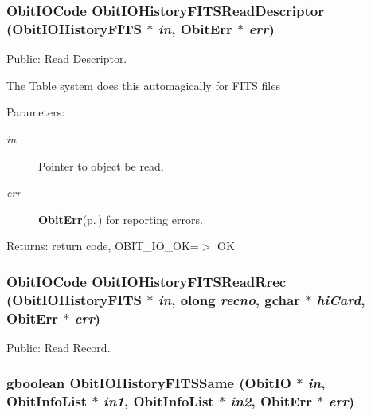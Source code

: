 \subsubsection{\setlength{\rightskip}{0pt plus 5cm}Obit\-IOCode Obit\-IOHistory\-FITSRead\-Descriptor ({\bf Obit\-IOHistory\-FITS} $\ast$ {\em in}, {\bf Obit\-Err} $\ast$ {\em err})}\label{ObitIOHistoryFITS_8h_a17}


Public: Read Descriptor. 

The Table system does this automagically for FITS files \begin{Desc}
\item[Parameters:]
\begin{description}
\item[{\em in}]Pointer to object be read. \item[{\em err}]{\bf Obit\-Err}{\rm (p.\,\pageref{structObitErr})} for reporting errors. \end{description}
\end{Desc}
\begin{Desc}
\item[Returns:]return code, OBIT\_\-IO\_\-OK=$>$ OK \end{Desc}
\subsubsection{\setlength{\rightskip}{0pt plus 5cm}Obit\-IOCode Obit\-IOHistory\-FITSRead\-Rrec ({\bf Obit\-IOHistory\-FITS} $\ast$ {\em in}, {\bf olong} {\em recno}, gchar $\ast$ {\em hi\-Card}, {\bf Obit\-Err} $\ast$ {\em err})}\label{ObitIOHistoryFITS_8h_a14}


Public: Read Record. 

\subsubsection{\setlength{\rightskip}{0pt plus 5cm}gboolean Obit\-IOHistory\-FITSSame ({\bf Obit\-IO} $\ast$ {\em in}, {\bf Obit\-Info\-List} $\ast$ {\em in1}, {\bf Obit\-Info\-List} $\ast$ {\em in2}, {\bf Obit\-Err} $\ast$ {\em err})}\label{ObitIOHistoryFITS_8h_a8}


